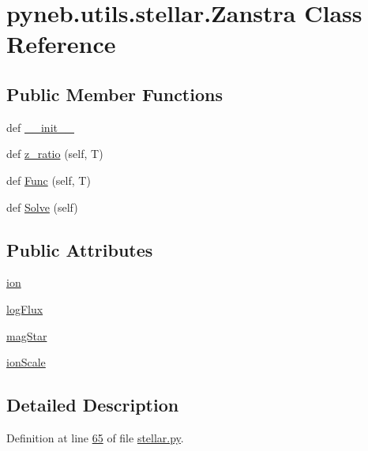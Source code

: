 \hypertarget{classpyneb_1_1utils_1_1stellar_1_1_zanstra}{}\section{pyneb.\+utils.\+stellar.\+Zanstra Class Reference}
\label{classpyneb_1_1utils_1_1stellar_1_1_zanstra}
\subsection*{Public Member Functions}
\begin{DoxyCompactItemize}
\item 
def \hyperlink{classpyneb_1_1utils_1_1stellar_1_1_zanstra_a2316eead01f32d876ea59a1b02a669c0}{\+\_\+\+\_\+init\+\_\+\+\_\+}
\item 
def \hyperlink{classpyneb_1_1utils_1_1stellar_1_1_zanstra_a09b6512a0ca6dbab445c4bdab0b68061}{z\+\_\+ratio} (self, T)
\item 
def \hyperlink{classpyneb_1_1utils_1_1stellar_1_1_zanstra_a74a4559b439f0dd2c695138c030ab488}{Func} (self, T)
\item 
def \hyperlink{classpyneb_1_1utils_1_1stellar_1_1_zanstra_a7c532590e7e53350b75d5d1f624a92f6}{Solve} (self)
\end{DoxyCompactItemize}
\subsection*{Public Attributes}
\begin{DoxyCompactItemize}
\item 
\hyperlink{classpyneb_1_1utils_1_1stellar_1_1_zanstra_a48c1797d46d49841c8b3a9275679e3ae}{ion}
\item 
\hyperlink{classpyneb_1_1utils_1_1stellar_1_1_zanstra_a8c4fddabe252ad4c539244ace4e79227}{log\+Flux}
\item 
\hyperlink{classpyneb_1_1utils_1_1stellar_1_1_zanstra_af635b1b8ca29b1b956b91e93f63fdf76}{mag\+Star}
\item 
\hyperlink{classpyneb_1_1utils_1_1stellar_1_1_zanstra_a8f04a2133b2acf4641a2ce08db7fc100}{ion\+Scale}
\end{DoxyCompactItemize}


\subsection{Detailed Description}


Definition at line \hyperlink{stellar_8py_source_l00065}{65} of file \hyperlink{stellar_8py_source}{stellar.\+py}.



